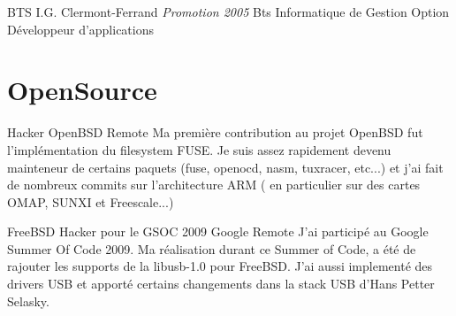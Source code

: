 \documentclass[11pt,a4paper,sans]{moderncv}
\begin{document}
{BTS}
{I.G.}
{Clermont-Ferrand}
{\textit{Promotion 2005}}
{Bts Informatique de Gestion Option D\'{e}veloppeur d'applications}

\section{OpenSource}

{Hacker}
{OpenBSD}
{Remote}
{}
{
Ma premi\`ere contribution au projet OpenBSD fut l'impl\'ementation du filesystem
FUSE.\newline{}
Je suis assez rapidement devenu mainteneur de certains paquets (fuse, 
openocd, nasm, tuxracer, etc...) et j'ai fait de nombreux commits sur l'architecture
ARM ( en particulier sur des cartes OMAP, SUNXI et Freescale...) 
}

{FreeBSD Hacker pour le GSOC 2009}
{Google}
{Remote}
{}
{
J'ai particip\'e au Google Summer Of Code 2009. Ma r\'ealisation
durant ce Summer of Code, a \'et\'e de rajouter les supports de la libusb-1.0 
pour FreeBSD. J'ai aussi implement\'e des drivers USB et apport\'e certains
changements dans la stack USB d'Hans Petter Selasky.
}
\end{document}
